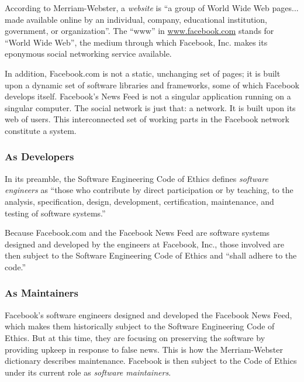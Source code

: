 \par According to Merriam-Webster, a \emph{website} is ``a group of World Wide Web pages... made available online by an individual, company, educational institution, government, or organization''. \cite{merriam_webster} The ``www'' in \url{www.facebook.com} stands for ``World Wide Web'', the medium through which Facebook, Inc. makes its eponymous social networking service available.

\par In addition, Facebook.com is not a static, unchanging set of pages; it is built upon a dynamic set of software libraries and frameworks, some of which Facebook develops itself. \cite{fb_code} Facebook's News Feed is not a singular application running on a singular computer. The social network is just that: a network. It is built upon its web of users. This interconnected set of working parts in the Facebook network constitute a system. \cite{oxford}

\subsubsection{As Developers}

\par In its preamble, the Software Engineering Code of Ethics defines \emph{software engineers} as ``those who contribute by direct participation or by teaching, to the analysis, specification, design, development, certification, maintenance, and testing of software systems.''\cite{se_code} 

\par Because Facebook.com and the Facebook News Feed are software systems designed and developed by the engineers at Facebook, Inc., those involved are then subject to the Software Engineering Code of Ethics and ``shall adhere to the code.'' \cite{se_code}

\subsubsection{As Maintainers}

\par Facebook's software engineers designed and developed the Facebook News Feed, which makes them historically subject to the Software Engineering Code of Ethics. But at this time, they are focusing on preserving the software by providing upkeep in response to false news. This is how the Merriam-Webster dictionary describes maintenance. \cite{merriam_webster} Facebook is then subject to the Code of Ethics under its current role as \emph{software maintainers}.

